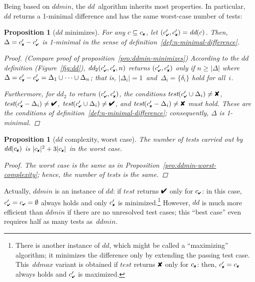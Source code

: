 \documentclass{acm_proc_article-sp}
\newcommand{\PASS}{\text{\ding{52}}\xspace}
\newcommand{\FAIL}{\text{\ding{56}}\xspace}
\newcommand{\cpass}{{c_{\scriptscriptstyle \PASS}}}
\newcommand{\cfail}{{c_{\scriptscriptstyle \FAIL}}}
\newcommand{\dpass}{{c'_{\scriptscriptstyle \PASS}}}
\newcommand{\dfail}{{c'_{\scriptscriptstyle \FAIL}}}
\newcommand{\dd}{\textit{dd}\xspace}
\newcommand{\test}{\textit{test}\xspace}
\newcommand{\ddmin}{\textit{ddmin}\xspace}
\newcommand{\ddmax}{\textit{ddmax}\xspace}
\theoremstyle{plain}
\newtheorem{proposition}[definition]{Proposition}
\let\oldfootnote=\footnote
\renewcommand{\footnote}[1]{\oldfootnote{\let\small=\scriptsize #1}}
\begin{document}
Being based on $\ddmin$, the $\dd$~algorithm inherits most properties.
In particular, $\dd$ returns a 1-minimal difference and has the same
worst-case number of tests:

\begin{proposition}[$\dd$ minimizes]
\label{pro:dd-minimizes}
  For any $c \subseteq \cfail$, let $(\dpass, \dfail) = \dd(c)$.  Then, $\Delta =
  \dfail - \dpass$ is 1-minimal in the sense of
  definition~\ref{def:n-minimal-difference}.
\begin{proof}
  (Compare proof of proposition~\ref{pro:ddmin-minimizes}) According
  to the $\dd$ definition (Figure~\ref{fig:dd}), $\dd_2(\dpass,
  \dfail, n)$ returns $(\dpass, \dfail)$ only if $n \geq |\Delta|$ where
  $\Delta = \dfail - \dpass = \Delta_1 \cup \dots \cup \Delta_n$; that is, $|\Delta_i| =
  1$~and~$\Delta_i = \{\delta_i\}$ hold for all~$i$.  

  Furthermore, for $\dd_2$ to return $(\dpass, \dfail)$, the conditions
  $\test(\dpass \cup \Delta_i) \neq \FAIL$, 
  $\test(\dfail - \Delta_i) \neq \PASS$, 
  $\test(\dpass \cup \Delta_i) \neq \PASS$, and
  $\test(\dfail - \Delta_i) \neq \FAIL$ must hold.  These are the conditions of
  definition~\ref{def:n-minimal-difference}; consequently, $\Delta$ is 1-minimal.
\end{proof}
\end{proposition}

\begin{proposition}[$\dd$ complexity, worst case]
\label{pro:dd-worst-complexity}
The number of tests carried out by $\dd(\cfail)$ is $|\cfail|^2 + 3|\cfail|$ 
in the worst case.
\begin{proof}
  The worst case is the same as in
  Proposition~\ref{pro:ddmin-worst-complexity}; hence, the number of
  tests is the same.
\end{proof}
\end{proposition}


Actually, $\ddmin$ is an instance of $\dd$: if $\test$ returns $\PASS$
only for $\cpass$: in this case, $\dpass = \cpass = \emptyset$ always holds
and only $\dfail$ is minimized.\footnote{There is another instance of
  $\dd$, which might be called a ``maximizing'' algorithm; it
  minimizes the difference only by extending the passing test case.
  This~$\ddmax$ variant is obtained if $\test$ returns $\FAIL$ only
  for $\cfail$: then, $\dfail = \cfail$ always holds and $\dpass$ is
  maximized.}  However, $\dd$ is much more efficient than $\ddmin$ if
there are no unresolved test cases; this ``best case'' even requires
half as many tests as~$\ddmin$.
\end{document}

